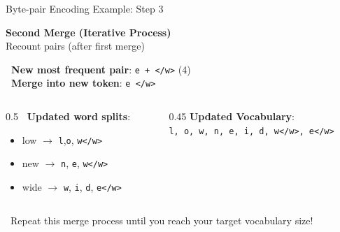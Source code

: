 \documentclass[aspectratio=169,xcolor=dvipsnames,svgnames,x11names,fleqn]{beamer}
\begin{document}
\begin{frame}{Byte-pair Encoding Example: Step 3}
    \begin{tcolorbox}[colback=white, colframe=bpeIndigo, arc=0mm, leftrule=3mm]
        \footnotesize \textbf{Second Merge (Iterative Process)} \\
        \scriptsize Recount pairs (after first merge)
    \end{tcolorbox}

    \textbf{\faArrowCircleRight \ New most frequent pair}: \textcolor{mergecolor}{\texttt{e + </w>}} (4) \\
    \textbf{\faCogs \ Merge into new token}: \textcolor{mergecolor}{\texttt{e </w>}}
    
    \vspace{1em}
    \begin{columns}
        \begin{column}{0.5\textwidth}
            \textbf{\faSync \ Updated word splits}:
            \begin{itemize}
                \item \scriptsize low $\rightarrow$ \texttt{l},\texttt{o}, \texttt{w</w>}
                \item \scriptsize new $\rightarrow$ \texttt{n}, \texttt{e}, \texttt{w</w>}
                \item \scriptsize wide $\rightarrow$ \texttt{w}, \texttt{i}, \texttt{d}, \textcolor{mergecolor}{\texttt{e}\texttt{</w>}}
            \end{itemize}
        \end{column}
        \begin{column}{0.45\textwidth}
             \scriptsize \textbf{Updated Vocabulary}: \\
             \textcolor{vocabcolor}{\texttt{l, o, w, n,  e, i, d, w</w>, e</w>}}
        \end{column}
    \end{columns}
    
    \vfill
    \centering \footnotesize \faRedo \ Repeat this merge process until you reach your target vocabulary size!
\end{frame}
\end{document}
